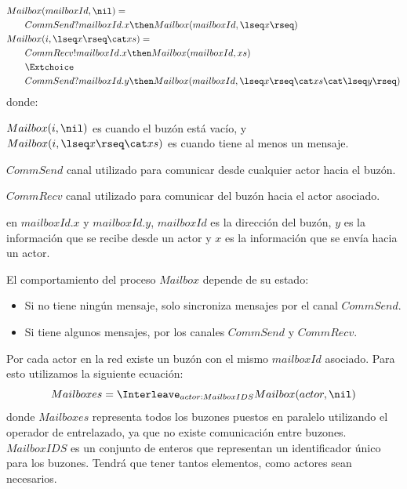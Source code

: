 \begin{align}\label{eq:mailbox}
\begin{split}
Mai&lbox(mailboxId, \nil) = {} \\
&CommSend?mailboxId.x \then Mailbox(mailboxId, \lseq x \rseq) \\
Mai&lbox(i, \lseq x \rseq \cat xs ) = {} \\ 
   &CommRecv!mailboxId.x \then Mailbox(mailboxId, xs) \\
   &\Extchoice \\
   &CommSend?mailboxId.y \then Mailbox(mailboxId, \lseq x \rseq \cat xs \cat \lseq y \rseq ) 
\end{split}
\end{align}
donde:
\begin{description}
 \item $Mailbox(i, \nil)$ es cuando el buzón está vacío, y $Mailbox(i, \lseq x \rseq \cat xs )$ es cuando tiene al menos un mensaje. 
 \item $CommSend$ canal utilizado para comunicar desde cualquier actor hacia el buzón.
 \item $CommRecv$ canal utilizado para comunicar del buzón hacia el actor asociado.
 \item en $mailboxId.x$ y $mailboxId.y$, $mailboxId$ es la dirección del buzón, $y$ es la información que se recibe desde un actor y $x$ es la información que se envía hacia un actor.
 \end{description}
El comportamiento del proceso $Mailbox$ depende de su estado:
\begin{itemize}
\item Si no tiene ningún mensaje, solo sincroniza mensajes por el canal $CommSend$.
\item Si tiene algunos mensajes, por los canales $CommSend$ y $CommRecv$.
\end{itemize}

Por cada actor en la red existe un buzón con el mismo $mailboxId$ asociado. Para esto utilizamos la siguiente ecuación:
\begin{equation}\label{eq:mailboxes}
Mailboxes = \Interleave_{ actor : MailboxIDS } Mailbox(actor, \nil) 
\end{equation}
donde $Mailboxes$ representa todos los buzones puestos en paralelo utilizando el operador de entrelazado, ya que no existe comunicación entre buzones. $MailboxIDS$ es un conjunto de enteros que representan un identificador único para los buzones. Tendrá que tener tantos elementos, como actores sean necesarios.


